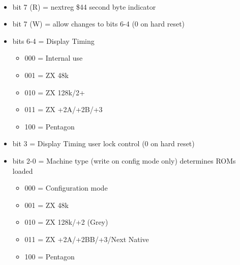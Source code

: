 \\
\begin{itemize}
\item bit 7 (R) = nextreg \$44 second byte indicator
\item bit 7 (W) = allow changes to bits 6-4 (0 on hard reset)
\item bits 6-4 = Display Timing
  \begin{itemize}
  \item 000 = Internal use
  \item 001 = ZX 48k
  \item 010 = ZX 128k/2+
  \item 011 = ZX +2A/+2B/+3
  \item 100 = Pentagon
  \end{itemize}
\item bit 3 = Display Timing user lock control (0 on hard reset)
\item bits 2-0 = Machine type (write on config mode only) determines ROMs loaded
  \begin{itemize}
  \item 000 = Configuration mode
  \item 001 = ZX 48k
  \item 010 = ZX 128k/+2 (Grey)
  \item 011 = ZX +2A/+2BB/+3/Next Native
  \item 100 = Pentagon
  \end{itemize}
\end{itemize}

